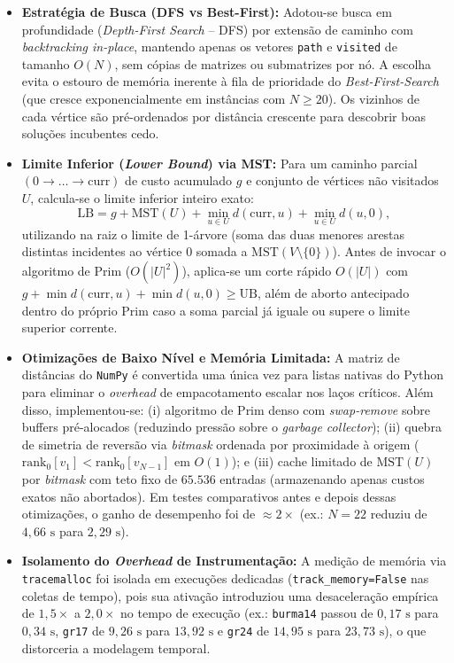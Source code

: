\documentclass[12pt]{article}
\begin{document}
\begin{itemize}
    \item \textbf{Estratégia de Busca (DFS vs Best-First):} Adotou-se busca em profundidade (\textit{Depth-First Search} -- DFS) por extensão de caminho com \textit{backtracking in-place}, mantendo apenas os vetores \texttt{path} e \texttt{visited} de tamanho $O(N)$, sem cópias de matrizes ou submatrizes por nó. A escolha evita o estouro de memória inerente à fila de prioridade do \textit{Best-First-Search} (que cresce exponencialmente em instâncias com $N \ge 20$). Os vizinhos de cada vértice são pré-ordenados por distância crescente para descobrir boas soluções incubentes cedo.
    
    \item \textbf{Limite Inferior (\textit{Lower Bound}) via MST:} Para um caminho parcial $(0 \to \dots \to \text{curr})$ de custo acumulado $g$ e conjunto de vértices não visitados $U$, calcula-se o limite inferior inteiro exato:
    \[
        \mathrm{LB} = g + \mathrm{MST}(U) + \min_{u \in U} d(\text{curr}, u) + \min_{u \in U} d(u, 0),
    \]
    utilizando na raiz o limite de 1-árvore (soma das duas menores arestas distintas incidentes ao vértice $0$ somada a $\mathrm{MST}(V \setminus \{0\})$). Antes de invocar o algoritmo de Prim ($O(|U|^2)$), aplica-se um corte rápido $O(|U|)$ com $g + \min d(\text{curr}, u) + \min d(u, 0) \ge \mathrm{UB}$, além de aborto antecipado dentro do próprio Prim caso a soma parcial já iguale ou supere o limite superior corrente.

    \item \textbf{Otimizações de Baixo Nível e Memória Limitada:} A matriz de distâncias do \texttt{NumPy} é convertida uma única vez para listas nativas do Python para eliminar o \textit{overhead} de empacotamento escalar nos laços críticos. Além disso, implementou-se: (i) algoritmo de Prim denso com \textit{swap-remove} sobre buffers pré-alocados (reduzindo pressão sobre o \textit{garbage collector}); (ii) quebra de simetria de reversão via \textit{bitmask} ordenada por proximidade à origem ($\text{rank}_0[v_1] < \text{rank}_0[v_{N-1}]$ em $O(1)$); e (iii) cache limitado de $\mathrm{MST}(U)$ por \textit{bitmask} com teto fixo de $65.536$ entradas (armazenando apenas custos exatos não abortados). Em testes comparativos antes e depois dessas otimizações, o ganho de desempenho foi de $\approx 2\times$ (ex.: $N=22$ reduziu de $4{,}66\text{ s}$ para $2{,}29\text{ s}$).

    \item \textbf{Isolamento do \textit{Overhead} de Instrumentação:} A medição de memória via \texttt{tracemalloc} foi isolada em execuções dedicadas (\texttt{track\_memory=False} nas coletas de tempo), pois sua ativação introduziou uma desaceleração empírica de $1{,}5\times$ a $2{,}0\times$ no tempo de execução (ex.: \texttt{burma14} passou de $0{,}17\text{ s}$ para $0{,}34\text{ s}$, \texttt{gr17} de $9{,}26\text{ s}$ para $13{,}92\text{ s}$ e \texttt{gr24} de $14{,}95\text{ s}$ para $23{,}73\text{ s}$), o que distorceria a modelagem temporal.
\end{itemize}
\end{document}
